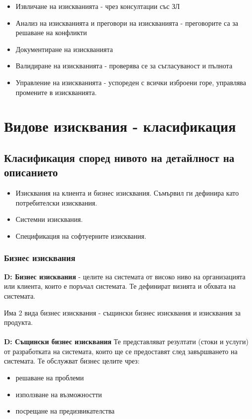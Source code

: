\documentclass[fleqn,12pt]{article}
\begin{document}
\begin{itemize}
	\item Извличане на изискванията - чрез консултации със ЗЛ
	\item Анализ на изискванията и преговори на изискванията - преговорите са за решаване на конфликти
	\item Документиране на изискванията
	\item Валидиране на изискванията - проверява се за съгласуваност и пълнота
	\item Управление на изискванията - успореден с всички изброени горе, управлява промените в изискванията.
\end{itemize}

\section{Видове изисквания - класификация}

\subsection{Класификация според нивото на детайлност на описанието}

\begin{itemize}
	\item Изисквания на клиента и бизнес изисквания. Съмървил ги дефинира като потребителски изисквания.
	\item Системни изисквания.
	\item Спецификация на софтуерните изисквания.
\end{itemize}

\subsubsection{Бизнес изисквания}
\textbf{D: Бизнес изисквания} - целите на системата от високо ниво на организацията или клиента, които е поръчал системата. Те дефинират визията и обхвата на системата.

Има 2 вида бизнес изисквания - същински бизнес изисквания и изисквания за продукта.

\paragraph{}
\textbf{D: Същински бизнес изисквания} Те представляват резултати (стоки и услуги) от разработката на системата, които ще се предоставят след завършването на системата. Те обслужват бизнес целите чрез:
\begin{itemize}
	\item решаване на проблеми
	\item използване на възможностти
	\item посрещане на предизвикателства
\end{itemize}
\end{document}
